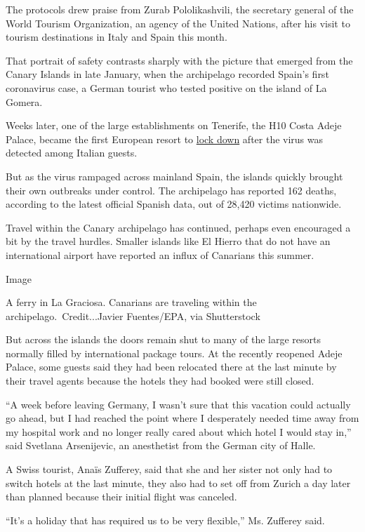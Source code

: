 The protocols drew praise from Zurab Pololikashvili, the secretary
general of the World Tourism Organization, an agency of the United
Nations, after his visit to tourism destinations in Italy and Spain this
month.

That portrait of safety contrasts sharply with the picture that emerged
from the Canary Islands in late January, when the archipelago recorded
Spain's first coronavirus case, a German tourist who tested positive on
the island of La Gomera.

Weeks later, one of the large establishments on Tenerife, the H10 Costa
Adeje Palace, became the first European resort to
\href{https://www.nytimes3xbfgragh.onion/2020/02/26/world/europe/spain-coronavirus.html}{lock
down} after the virus was detected among Italian guests.

But as the virus rampaged across mainland Spain, the islands quickly
brought their own outbreaks under control. The archipelago has reported
162 deaths, according to the latest official Spanish data, out of 28,420
victims nationwide.

Travel within the Canary archipelago has continued, perhaps even
encouraged a bit by the travel hurdles. Smaller islands like El Hierro
that do not have an international airport have reported an influx of
Canarians this summer.

Image

A ferry in La Graciosa. Canarians are traveling within the
archipelago.~Credit...Javier Fuentes/EPA, via Shutterstock

But across the islands the doors remain shut to many of the large
resorts normally filled by international package tours. At the recently
reopened Adeje Palace, some guests said they had been relocated there at
the last minute by their travel agents because the hotels they had
booked were still closed.

``A week before leaving Germany, I wasn't sure that this vacation could
actually go ahead, but I had reached the point where I desperately
needed time away from my hospital work and no longer really cared about
which hotel I would stay in,'' said Svetlana Arsenijevic, an anesthetist
from the German city of Halle.

A Swiss tourist, Anaïs Zufferey, said that she and her sister not only
had to switch hotels at the last minute, they also had to set off from
Zurich a day later than planned because their initial flight was
canceled.

``It's a holiday that has required us to be very flexible,'' Ms.
Zufferey said.


